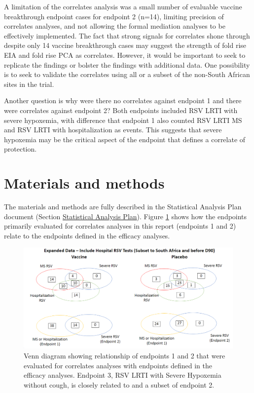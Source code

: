 \documentclass[11pt]{article}
\begin{document}
A limitation of the correlates analysis was a small number of evaluable vaccine breakthrough endpoint cases for endpoint 2 (n=14), limiting precision of correlates analyses, and not allowing the formal mediation analyses to be effectively implemented. The fact that strong signals for correlates shone through despite only 14 vaccine breakthrough cases may suggest the strength of fold rise EIA and fold rise PCA as correlates. However, it would be important to seek to replicate the findings or bolster the findings with additional data. One possibility is to seek to validate the correlates using all or a subset of the non-South African sites in the trial.

Another question is why were there no correlates against endpoint 1 and there were correlates against endpoint 2? Both endpoints included RSV LRTI with severe hypoxemia, with difference that endpoint 1 also counted RSV LRTI MS and RSV LRTI with hospitalization as events. This suggests that severe hypoxemia may be the critical aspect of the endpoint that defines a correlate of protection.

\hypertarget{materials-and-methods}{%
\section{Materials and methods}\label{materials-and-methods}}

The materials and methods are fully described in the Statistical Analysis Plan document (Section \protect\hyperlink{statistical-analysis-plan}{Statistical Analysis Plan}). Figure \ref{fig:endpoints_venn_diagrams} shows how the endpoints primarily evaluated for correlates analyses in this report (endpoints 1 and 2) relate to the endpoints defined in the efficacy analyses.

\begin{figure}[H]
    \centering
    \includegraphics[width=.8\textwidth]{endpoints_venn_diagrams}
    \caption{Venn diagram showing relationship of endpoints 1 and 2 that were evaluated for correlates analyses with endpoints defined in the efficacy analyses. Endpoint 3, RSV LRTI with Severe Hypoxemia without cough, is closely related to and a subset of endpoint 2.}
    \label{fig:endpoints_venn_diagrams}
\end{figure}
\end{document}
